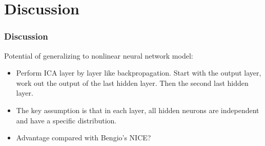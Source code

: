 \documentclass{beamer}
\begin{document}
\section{Discussion}
\begin{frame}
\frametitle{Discussion}

\footnotesize

Potential of generalizing to nonlinear neural network model:
\begin{itemize}
\item Perform ICA layer by layer like backpropagation. Start with the output layer, work out the output of the last hidden layer. Then the second last hidden layer.  
\vspace{0.1in}
\item The key assumption is that in each layer, all hidden neurons are independent and have a specific distribution.
\vspace{0.1in}
\item Advantage compared with Bengio's NICE?
\end{itemize}
\end{frame}
\end{document}

